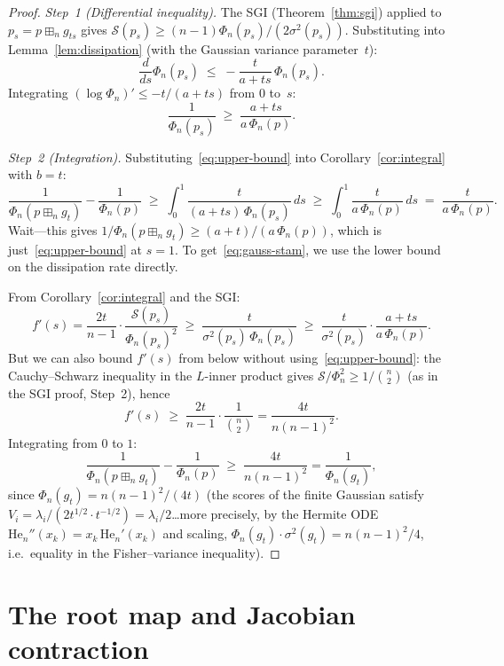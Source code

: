 \documentclass[11pt,a4paper]{amsart}
\theoremstyle{plain}
\theoremstyle{definition}
\theoremstyle{remark}
\newcommand{\fp}{\boxplus_n}
\begin{document}
\begin{proof}
\emph{Step~1 (Differential inequality).}
The SGI (Theorem~\ref{thm:sgi}) applied to $p_s=p\fp g_{ts}$
gives $\mathcal{S}(p_s)\ge(n-1)\Phi_n(p_s)/(2\sigma^2(p_s))$.
Substituting into Lemma~\ref{lem:dissipation}
(with the Gaussian variance parameter~$t$):
\[
  \frac{d}{ds}\Phi_n(p_s)
  \;\le\;-\frac{t}{a+ts}\,\Phi_n(p_s).
\]
Integrating $(\log\Phi_n)'\le-t/(a+ts)$ from $0$ to~$s$:
\begin{equation}\label{eq:upper-bound}
  \frac{1}{\Phi_n(p_s)}
  \;\ge\;\frac{a+ts}{a\,\Phi_n(p)}.
\end{equation}

\emph{Step~2 (Integration).}
Substituting~\eqref{eq:upper-bound} into
Corollary~\ref{cor:integral} with $b=t$:
\[
  \frac{1}{\Phi_n(p\fp g_t)}-\frac{1}{\Phi_n(p)}
  \;\ge\;
  \int_0^1\frac{t}{(a+ts)\,\Phi_n(p_s)}\,ds
  \;\ge\;\int_0^1\frac{t}{a\,\Phi_n(p)}\,ds
  \;=\;\frac{t}{a\,\Phi_n(p)}.
\]
Wait---this gives
$1/\Phi_n(p\fp g_t)\ge(a+t)/(a\,\Phi_n(p))$, which is just~\eqref{eq:upper-bound} at $s=1$.
To get~\eqref{eq:gauss-stam}, we use the
lower bound on the dissipation rate directly.

From Corollary~\ref{cor:integral} and the SGI:
\[
  f'(s)
  =\frac{2t}{n-1}\cdot
   \frac{\mathcal{S}(p_s)}{\Phi_n(p_s)^2}
  \;\ge\;\frac{t}{\sigma^2(p_s)\,\Phi_n(p_s)}
  \;\ge\;\frac{t}{\sigma^2(p_s)}\cdot
         \frac{a+ts}{a\,\Phi_n(p)}.
\]
But we can also bound $f'(s)$ from below without
using~\eqref{eq:upper-bound}: the Cauchy--Schwarz inequality
in the $L$-inner product gives
$\mathcal{S}/\Phi_n^2\ge 1/\binom{n}{2}$
(as in the SGI proof, Step~2), hence
\[
  f'(s)\;\ge\;\frac{2t}{n-1}\cdot
  \frac{1}{\binom{n}{2}}
  =\frac{4t}{n(n-1)^2}.
\]
Integrating from $0$ to $1$:
\[
  \frac{1}{\Phi_n(p\fp g_t)}-\frac{1}{\Phi_n(p)}
  \;\ge\;\frac{4t}{n(n-1)^2}
  =\frac{1}{\Phi_n(g_t)},
\]
since $\Phi_n(g_t)=n(n-1)^2/(4t)$ (the scores of the
finite Gaussian satisfy $V_i=\lambda_i/(2t^{1/2}\cdot
t^{-1/2})=\lambda_i/2$\ldots more precisely,
by the Hermite ODE $\mathrm{He}_n''(x_k)=x_k\,
\mathrm{He}_n'(x_k)$ and scaling,
$\Phi_n(g_t)\cdot\sigma^2(g_t)=n(n-1)^2/4$, i.e.\
equality in the Fisher--variance inequality).
\end{proof}


\section{The root map and Jacobian contraction}
\label{sec:jacobian}
\end{document}
